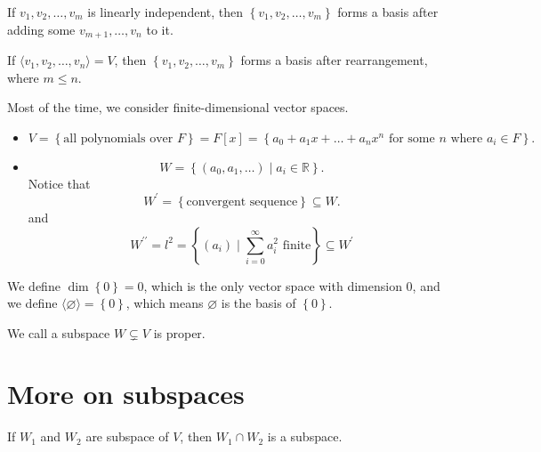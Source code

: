 \begin{corollary}
    If \(v_1, v_2, \dots , v_m\) is linearly independent, then \(\left\{ v_1, v_2, \dots , v_m \right\} \) forms a basis after adding some \(v_{m+1}, \dots , v_n\) to it.  
\end{corollary}

\begin{theorem} \label{thm: srhink basis}
    If \(\langle v_1, v_2, \dots , v_n \rangle = V \), then \(\left\{ v_1, v_2, \dots , v_m \right\} \) forms a basis after rearrangement, where \(m \le n\).  
\end{theorem}

\begin{remark}
    Most of the time, we consider finite-dimensional vector spaces.
\end{remark}

\begin{remark}
    \vphantom{text}
    \begin{itemize}
        \item     \[
        V = \left\{ \text{all polynomials over } F \right\} = F[x] = \left\{ a_0 + a_1 x + \dots + a_n x^n \text{ for some } n \text{ where } a_i \in F\right\}. 
    \]
        \item
    \[
        W = \left\{ (a_0, a_1, \dots ) \mid a_i \in \mathbb{R}  \right\}. 
    \]
    Notice that 
    \[
         W^{\prime} = \left\{ \text{convergent sequence} \right\} \subseteq W. 
    \] and 
    \[
        W^{\prime\prime}  = l^2 = \left\{ (a_i) \mid \sum_{i=0}^{\infty} a_i^2 \text{ finite}  \right\} \subseteq W^{\prime} 
    \]
    \end{itemize}
\end{remark}

\begin{remark}
    We define \(\dim \left\{ 0 \right\} = 0 \), which is the only vector space with dimension \(0\), and we define \(\langle \varnothing  \rangle = \left\{ 0 \right\}\), which means \(\varnothing \) is the basis of \(\left\{ 0 \right\} \).  
\end{remark}

\begin{note}
    We call a subspace \(W \subsetneq V\) is proper. 
\end{note}

\section{More on subspaces}
\begin{theorem} \label{thm: intersection of subspace is subspace}
    If \(W_1\) and \(W_2\) are subspace of \(V\), then \(W_1 \cap W_2\) is a subspace.    
\end{theorem}


